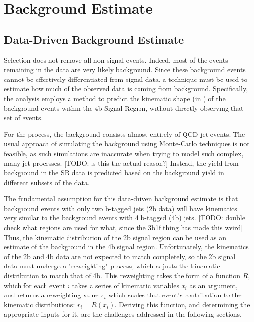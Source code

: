 \chapter{Background Estimate} \label{chapter:background}

\section{Data-Driven Background Estimate}

    Selection does not remove all non-signal events.
    Indeed, most of the events remaining in the data are very likely background.
    Since these background events cannot be effectively differentiated from signal data,
        a technique must be used to estimate how much of the observed data is coming from background.
    Specifically, the analysis employs a method to predict the kinematic shape (in \mhh)
        of the background events within the 4b Signal Region,
        without directly observing that set of events.

    For the \vbfproc process, the background consists almost entirely of QCD jet events.
    The usual approach of simulating the background using Monte-Carlo techniques is not feasible,
        as such simulations are inaccurate when trying to model such complex, many-jet processes. [TODO: is this the actual reason?]
    Instead, the yield from background in the SR data is predicted based on the background yield in different subsets of the data.
        
    The fundamental assumption for this data-driven background estimate
        is that background events with only two b-tagged jets (2b data)
        will have kinematics very similar to the background events with 4 b-tagged (4b) jets.
    [TODO: double check what regions are used for what, since the 3b1f thing has made this weird]
    Thus, the kinematic distribution of the 2b signal region can be used as an estimate of the background in the 4b signal region.
    Unfortunately, the kinematics of the 2b and 4b data are not expected to match completely,
        so the 2b signal data must undergo a "reweighting" process,
        which adjusts the kinematic distribution to match that of 4b.
    This reweighting takes the form of a function $R$,
        which for each event $i$ takes a series of kinematic variables $x_i$ as an argument,
        and returns a reweighting value $r_i$ which scales that event's contribution to the kinematic distributions:
        $r_i = R(x_i)$.
    Deriving this function, and determining the appropriate inputs for it,
        are the challenges addressed in the following sections.

